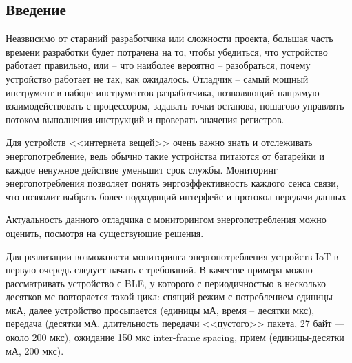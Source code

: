 \begin{input}
\chapter{Введение}
\hspace{1cm} Неазвисимо от стараний разработчика или сложности проекта, большая часть времени разработки
будет потрачена на то, чтобы убедиться, что устройство работает правильно, или -- что наиболее
вероятно -- разобраться, почему устройство работает не так, как ожидалось. Отладчик -- самый мощный 
инструмент в наборе инструментов разработчика, позволяющий напрямую взаимодействовать с процессором,
задавать точки останова, пошагово управлять потоком выполнения инструкций и проверять  значения
регистров. 

Для устройств <<интернета вещей>> очень важно знать и отслеживать энергопотребление,
ведь обычно такие устройства питаются от батарейки и каждое ненужное действие уменьшит
срок службы. Мониторинг энергопотребления позволяет понять энргоэффективность каждого сенса связи,
что позволит выбрать более подходящий интерфейс и протокол передачи данных

Актуальность данного отладчика с мониторингом энергопотребления можно оценить, посмотря
на существующие решения.

Для реализации возможности мониторинга энергопотребления устройств IoT 
в первую очередь следует начать с требований. В качестве примера можно рассматривать устройство с BLE, 
у которого с периодичностью в несколько десятков мс повторяется такой цикл: спящий режим 
с потреблением единицы мкА, далее устройство просыпается (единицы мА, время -- десятки мкс), 
передача (десятки мА, длительность передачи <<пустого>> пакета, 27 байт — около 200 мкс), 
ожидание 150 мкс inter-frame spacing, прием (единицы-десятки мА, 200 мкс).
\end{input}